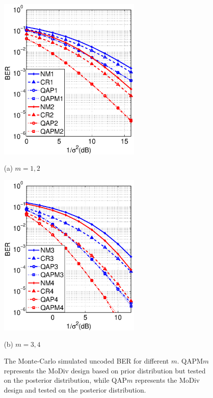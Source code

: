 \documentclass[journal,draftcls,onecolumn,12pt,twoside]{IEEEtran}
\begin{document}
\begin{figure}[htb]
  \begin{minipage}[b]{.48\linewidth}
    \centering
    \centerline{\includegraphics[width=7cm]{./figs/BER_noise_power_mismatch_MonteCarlo_64QAM_23.eps}}
    \centerline{(a) $m=1,2$}\medskip
  \end{minipage}
  \hfill
  \begin{minipage}[b]{0.48\linewidth}
    \centering
    \centerline{\includegraphics[width=7cm]{./figs/BER_noise_power_mismatch_MonteCarlo_64QAM_45.eps}}
    \centerline{(b) $m=3,4$}\medskip
  \end{minipage}
  \caption{The Monte-Carlo simulated uncoded BER for different $m$.
  QAPM$m$ represents the MoDiv design based on prior distribution but tested on
  the posterior distribution, while QAP$m$ represents the MoDiv design and
  tested on the posterior distribution.}
  \label{fig:mismatch}
\end{figure}
\end{document}
